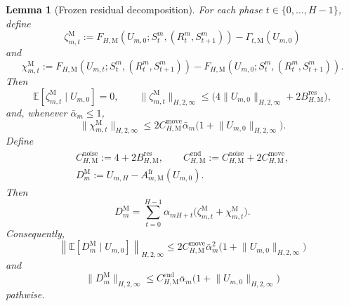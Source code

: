 \documentclass{article}
\newtheorem{lemma}[theorem]{Lemma}
\begin{document}
\begin{lemma}[Frozen residual decomposition]
\label{lem:fh-mtd-bias}
For each phase $t\in\{0,\dots,H-1\}$, define
\begin{equation}
\zeta_{m,t}^{\mathrm M}:=F_{H,\mathrm M}(U_{m,0};S_t^m,(R_t^m,S_{t+1}^m))-\Gamma_{t,\mathrm M}(U_{m,0})
\end{equation}
and
\begin{equation}
\chi_{m,t}^{\mathrm M}:=F_{H,\mathrm M}(U_{m,t};S_t^m,(R_t^m,S_{t+1}^m))-F_{H,\mathrm M}(U_{m,0};S_t^m,(R_t^m,S_{t+1}^m)).
\end{equation}
Then
\begin{equation}
\mathbb E\left[\zeta_{m,t}^{\mathrm M}\mid U_{m,0}\right]=0,\qquad
\lVert\zeta_{m,t}^{\mathrm M}\rVert_{H,2,\infty}\le\bigl(4\lVert U_{m,0}\rVert_{H,2,\infty}+2B_{H,\mathrm M}^{\mathrm{res}}\bigr),
\end{equation}
and, whenever $\bar\alpha_m\le1$,
\begin{equation}
\lVert\chi_{m,t}^{\mathrm M}\rVert_{H,2,\infty}\le2C_{H,\mathrm M}^{\mathrm{move}}\bar\alpha_m\bigl(1+\lVert U_{m,0}\rVert_{H,2,\infty}\bigr).
\end{equation}
Define
\begin{equation}
\begin{gathered}
C_{H,\mathrm M}^{\mathrm{noise}}:=4+2B_{H,\mathrm M}^{\mathrm{res}},\qquad
C_{H,\mathrm M}^{\mathrm{end}}:=C_{H,\mathrm M}^{\mathrm{noise}}+2C_{H,\mathrm M}^{\mathrm{move}},\\
D_m^{\mathrm M}:=U_{m,H}-A_{m,\mathrm M}^{\mathrm{fr}}(U_{m,0}).
\end{gathered}
\end{equation}
Then
\begin{equation}
D_m^{\mathrm M}=\sum_{t=0}^{H-1}\alpha_{mH+t}\bigl(\zeta_{m,t}^{\mathrm M}+\chi_{m,t}^{\mathrm M}\bigr).
\end{equation}
Consequently,
\begin{equation}
\left\lVert\mathbb E[D_m^{\mathrm M}\mid U_{m,0}]\right\rVert_{H,2,\infty}\le2C_{H,\mathrm M}^{\mathrm{move}}\bar\alpha_m^2\bigl(1+\lVert U_{m,0}\rVert_{H,2,\infty}\bigr)
\end{equation}
and
\begin{equation}
\lVert D_m^{\mathrm M}\rVert_{H,2,\infty}\le C_{H,\mathrm M}^{\mathrm{end}}\bar\alpha_m\bigl(1+\lVert U_{m,0}\rVert_{H,2,\infty}\bigr)
\end{equation}
pathwise.
\end{lemma}
\end{document}
